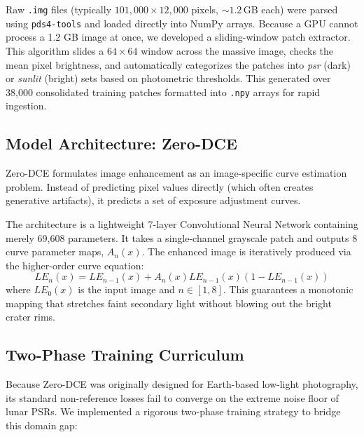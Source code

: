 \documentclass[conference]{IEEEtran}
\begin{document}
Raw \texttt{.img} files (typically $101,000 \times 12,000$ pixels, $\sim 1.2$\,GB each) were parsed using \texttt{pds4-tools} and loaded directly into NumPy arrays. Because a GPU cannot process a 1.2 GB image at once, we developed a sliding-window patch extractor. This algorithm slides a $64 \times 64$ window across the massive image, checks the mean pixel brightness, and automatically categorizes the patches into \textit{psr} (dark) or \textit{sunlit} (bright) sets based on photometric thresholds. This generated over 38,000 consolidated training patches formatted into \texttt{.npy} arrays for rapid ingestion.

\subsection{Model Architecture: Zero-DCE}
Zero-DCE formulates image enhancement as an image-specific curve estimation problem. Instead of predicting pixel values directly (which often creates generative artifacts), it predicts a set of exposure adjustment curves. 

The architecture is a lightweight 7-layer Convolutional Neural Network containing merely 69,608 parameters. It takes a single-channel grayscale patch and outputs 8 curve parameter maps, $A_n(x)$. The enhanced image is iteratively produced via the higher-order curve equation:
\begin{equation}
LE_{n}(x) = LE_{n-1}(x) + A_{n}(x)LE_{n-1}(x)(1 - LE_{n-1}(x))
\end{equation}
where $LE_0(x)$ is the input image and $n \in [1,8]$. This guarantees a monotonic mapping that stretches faint secondary light without blowing out the bright crater rims.

\subsection{Two-Phase Training Curriculum}
Because Zero-DCE was originally designed for Earth-based low-light photography, its standard non-reference losses fail to converge on the extreme noise floor of lunar PSRs. We implemented a rigorous two-phase training strategy to bridge this domain gap:
\end{document}
